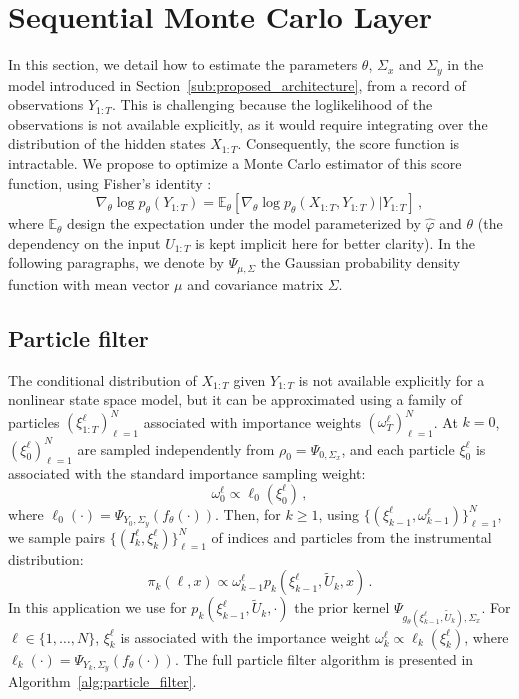 \documentclass[journal]{IEEEtran}
\begin{document}
\section{Sequential Monte Carlo Layer}%
\label{sub:uncertainty_estimation}
In this section, we detail how to estimate the parameters $\theta$, $\Sigma_x$ and $\Sigma_y$ in the model introduced in Section~\ref{sub:proposed_architecture}, from a record of observations $Y_{1:T}$.
This is challenging because the loglikelihood of the observations is not available explicitly, as it would require integrating over the distribution of the hidden states $X_{1:T}$.
Consequently, the score function is intractable.
We propose to optimize a Monte Carlo estimator of this score function, using Fisher's identity \cite{monographie-randal}:
\begin{equation}
	\nabla_\theta \log p_\theta(Y_{1:T}) = \mathbb{E}_\theta \left[ \nabla_\theta\log p_\theta(X_{1:T}, Y_{1:T}) | Y_{1:T} \right]\,,
	\label{eq:grad_ll}
\end{equation}
where $\mathbb{E}_\theta$ design the expectation under the model parameterized by $\widehat \varphi$ and $\theta$ (the dependency on the input $U_{1:T}$ is kept implicit here for better clarity).
In the following paragraphs, we denote by $\Psi_{\mu, \Sigma}$ the Gaussian probability density function with mean vector $\mu$ and covariance matrix $\Sigma$.

\subsection{Particle filter}
The conditional distribution of $X_{1:T}$ given $Y_{1:T}$ is not available explicitly for a nonlinear state space model, but it can be approximated using a family of particles $(\xi^{\ell}_{1:T})_{\ell=1}^N$ associated with importance weights $(\omega^{\ell}_T)_{\ell=1}^N$.
At $k = 0$, $(\xi^{\ell}_0)_{\ell=1}^N$ are sampled independently from $\rho_0 = \Psi_{0, \Sigma_x}$, and each particle $\xi^{\ell}_0$ is associated with the standard importance sampling weight:
\[
	\omega_0^{\ell} \propto \ell_0 \left(\xi^{\ell}_0\right)\,,
\]
where $\ell_0(\cdot) = \Psi_{Y_0, \Sigma_y}(f_\theta(\cdot))$.
Then, for $k\geq 1$, using $\{(\xi^{\ell}_{k-1},\omega^{\ell}_{k-1})\}_{\ell=1}^N$, we sample pairs $\{(I^{\ell}_k,\xi^{\ell}_{k})\}_{\ell=1}^N$ of indices and particles from the instrumental distribution:
\[
	\pi_{k}(\ell,x) \propto \omega_{k-1}^{\ell} p_k(\xi^{\ell}_{k-1},\widetilde U_k,x)\,.
\]
In this application we use for $p_k(\xi^{\ell}_{k-1},\widetilde U_k,\cdot)$ the prior kernel $\Psi_{g_\theta(\xi^\ell_{k-1}, \tilde U_k), \Sigma_x}$.
For $\ell \in \{1,\ldots,N\}$, $\xi^{\ell}_k$ is associated with the importance weight $\omega^{\ell}_k \propto \ell_k(\xi^{\ell}_k)$, where $\ell_k(\cdot) = \Psi_{Y_k, \Sigma_y}(f_\theta(\cdot))$.
The full particle filter algorithm is presented in Algorithm~\ref{alg:particle_filter}.
\end{document}
